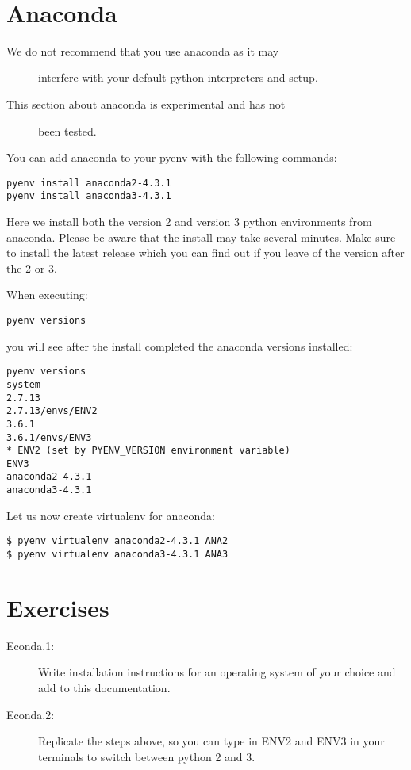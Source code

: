 \FILENAME\
\section{Anaconda}\label{anaconda}

\begin{description}
\item[We do not recommend that you use anaconda as it may]
interfere with your default python interpreters and setup.
\end{description}

\begin{description}
\item[This section about anaconda is experimental and has not]
been tested.
\end{description}

You can add anaconda to your pyenv with the following commands:

\begin{verbatim}
pyenv install anaconda2-4.3.1
pyenv install anaconda3-4.3.1
\end{verbatim}

Here we install both the version 2 and version 3 python environments
from anaconda. Please be aware that the install may take several
minutes. Make sure to install the latest release which you can find out
if you leave of the version after the 2 or 3.

When executing:

\begin{verbatim}
pyenv versions
\end{verbatim}

you will see after the install completed the anaconda versions
installed:

\begin{verbatim}
pyenv versions
system
2.7.13
2.7.13/envs/ENV2
3.6.1
3.6.1/envs/ENV3
* ENV2 (set by PYENV_VERSION environment variable)
ENV3
anaconda2-4.3.1
anaconda3-4.3.1
\end{verbatim}

Let us now create virtualenv for anaconda:

\begin{verbatim}
$ pyenv virtualenv anaconda2-4.3.1 ANA2
$ pyenv virtualenv anaconda3-4.3.1 ANA3
\end{verbatim}

\section{Exercises}\label{exercise}

\begin{description}
\item[Econda.1:]
Write installation instructions for an operating system of your choice
and add to this documentation.
\item[Econda.2:]
Replicate the steps above, so you can type in ENV2 and ENV3 in your
terminals to switch between python 2 and 3.
\end{description}
